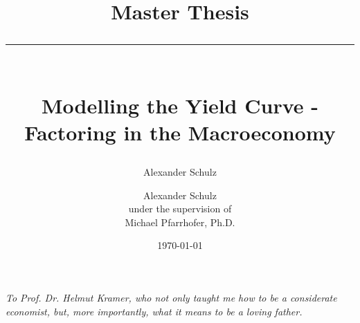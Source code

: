\documentclass[12 pt, a4paper]{article}
\title{%
    \textbf{Master Thesis}
    \par\noindent\rule{\textwidth}{0.4pt}
    \\ [1em]
    Modelling the Yield Curve - \\ 
    Factoring in the Macroeconomy}
\author{ \Large Alexander Schulz }
\author{\Large{Alexander Schulz}\\[1em]
\small{under the supervision of}\\[1em]
\large{Michael Pfarrhofer, Ph.D.}}
\date{\today}
\begin{document}
\maketitle
\thispagestyle{empty}
\pagebreak
\newpage\null
\thispagestyle{empty}


\begin{center}
    \justifying
    \textit{To Prof. Dr. Helmut Kramer, who not only taught me how to be a considerate economist, but, more importantly, what it means to be a loving father.}
\end{center}




\pagebreak
\tableofcontents
\thispagestyle{empty}
\pagebreak
\listoffigures
\thispagestyle{empty}
\listoftables
\thispagestyle{empty}

\clearpage
{}

\setlength{\parindent}{0em}
\setlength{\parskip}{1em}


\newpage







\newpage



\newpage



\pagebreak




\pagebreak
{}
\label{sec:references}
\printbibliography



\pagebreak
\appendix
\newpage

\end{document}
